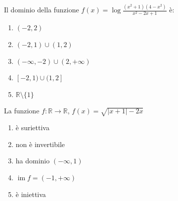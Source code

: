 \begin{quiz}
Il dominio della funzione $f(x)=\log\frac{(x^2+1)(4-x^2)}{x^2-2x+1}$ \`e:
\begin{enumerate}
\item $(-2,2)$
\item $(-2,1)\cup(1,2)$
\item $(-\infty,-2)\cup(2,+\infty)$
\item $[-2,1)\cup(1,2]$
\item $\mathbb R\setminus\{1\}$
\end{enumerate}
\end{quiz}

\begin{quiz}
La funzione $f:\mathbb R\to\mathbb R$, $f(x)=\sqrt{|x+1|-2x}$
\begin{enumerate}
\item \`e suriettiva
\item non \`e invertibile
\item ha dominio $(-\infty,1)$
\item $\operatorname{im}f=(-1,+\infty)$
\item \`e iniettiva
\end{enumerate}
\end{quiz}

